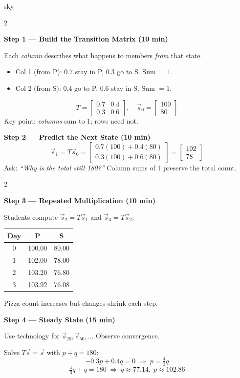 \documentclass[10pt]{article}
\begin{document}
\begin{skillbox}{sky}
\begin{multicols}{2}

\noindent\textbf{Step 1 --- Build the Transition Matrix (10 min)}

Each \emph{column} describes what happens to members \emph{from} that state.
\begin{itemize}[leftmargin=1.2em, itemsep=1pt]
  \item Col 1 (from P): $0.7$ stay in P, $0.3$ go to S. Sum $= 1$.
  \item Col 2 (from S): $0.4$ go to P, $0.6$ stay in S. Sum $= 1$.
\end{itemize}
\[T = \begin{bmatrix}0.7 & 0.4 \\ 0.3 & 0.6\end{bmatrix}, \quad \vec{s}_0 = \begin{bmatrix}100\\80\end{bmatrix}\]
Key point: \emph{columns} sum to 1; rows need not.

\columnbreak

\noindent\textbf{Step 2 --- Predict the Next State (10 min)}
\[
\vec{s}_1 = T\vec{s}_0 = \begin{bmatrix}0.7(100)+0.4(80)\\0.3(100)+0.6(80)\end{bmatrix} = \begin{bmatrix}102\\78\end{bmatrix}
\]
Ask: \textit{``Why is the total still 180?''} Column sums of 1 preserve the total count.
\end{multicols}

\begin{multicols}{2}

\noindent\textbf{Step 3 --- Repeated Multiplication (10 min)}

Students compute $\vec{s}_2 = T\vec{s}_1$ and $\vec{s}_3 = T\vec{s}_2$:

\begin{center}
\small
\begin{tabular}{c|cc}
Day & P & S \\\hline
0 & 100.00 & 80.00 \\
1 & 102.00 & 78.00 \\
2 & 103.20 & 76.80 \\
3 & 103.92 & 76.08 \\
\end{tabular}
\end{center}
Pizza count increases but changes shrink each step.

\columnbreak

\noindent\textbf{Step 4 --- Steady State (15 min)}

Use technology for $\vec{s}_{20}, \vec{s}_{50}, \ldots$ Observe convergence.

Solve $T\vec{s} = \vec{s}$ with $p + q = 180$:
\[-0.3p + 0.4q = 0 \;\Rightarrow\; p = \tfrac{4}{3}q\]
\[\tfrac{4}{3}q + q = 180 \;\Rightarrow\; q \approx 77.14,\; p \approx 102.86\]
\end{multicols}
\end{skillbox}
\end{document}
